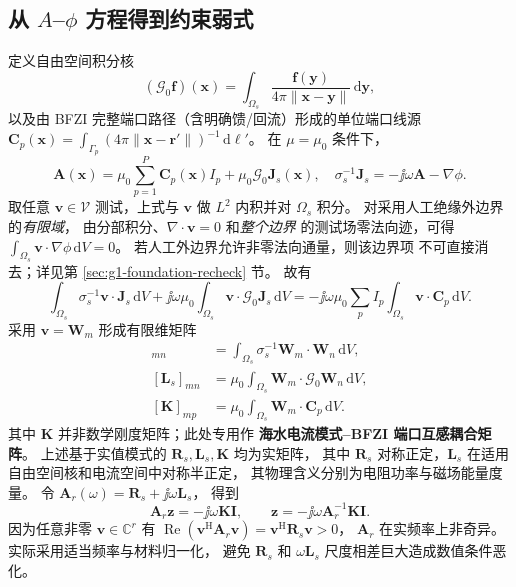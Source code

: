 \subsection{从 \(A\)--\(\phi\) 方程得到约束弱式}
定义自由空间积分核
\begin{equation}
(\mathcal G_0\bm f)(\bm x)
=\int_{\Omega_s}\frac{\bm f(\bm y)}
{4\pi\|\bm x-\bm y\|}\,\mathrm d\bm y,
\label{eq:free-g}
\end{equation}
以及由 BFZI 完整端口路径（含明确馈/回流）形成的单位端口线源
\(\bm C_p(\bm x)=\int_{\Gamma_p}(4\pi\|\bm x-\bm r'\|)^{-1}
\,\mathrm d\bm\ell'\)。
在 \(\mu=\mu_0\) 条件下，
\[
\bm A(\bm x)
=\mu_0\sum_{p=1}^P \bm C_p(\bm x)I_p
+\mu_0\mathcal G_0\bm J_s(\bm x),\quad
\sigma_s^{-1}\bm J_s=-\jj\omega\bm A-\nabla\phi .
\]
取任意 \(\bm v\in\mathcal V\) 测试，上式与 \(\bm v\) 做
\(L^2\) 内积并对 \(\Omega_s\) 积分。
对采用人工绝缘外边界的\emph{有限域}，
由分部积分、\(\nabla\cdot\bm v=0\) 和\emph{整个边界}
的测试场零法向迹，可得
\(\int_{\Omega_s}\bm v\cdot\nabla\phi\,\mathrm dV=0\)。
若人工外边界允许非零法向通量，则该边界项
不可直接消去；详见第 \ref{sec:g1-foundation-recheck} 节。
故有
\begin{equation}
\int_{\Omega_s}\sigma_s^{-1}\bm v\cdot\bm J_s\,\mathrm dV
+\jj\omega\mu_0\int_{\Omega_s}\bm v\cdot\mathcal G_0\bm J_s\,\mathrm dV
=-\jj\omega\mu_0\sum_p I_p\int_{\Omega_s}\bm v\cdot\bm C_p\,\mathrm dV .
\label{eq:sea-weak}
\end{equation}
采用 \(\bm v=\bm W_m\) 形成有限维矩阵
\begin{align}
[\bm R_s]_{mn}
&=\int_{\Omega_s}\sigma_s^{-1}\bm W_m\cdot\bm W_n\,\mathrm dV,
\label{eq:Rs}\\
[\bm L_s]_{mn}
&=\mu_0\int_{\Omega_s}\bm W_m\cdot\mathcal G_0\bm W_n\,\mathrm dV,
\label{eq:Ls}\\
[\bm K]_{mp}
&=\mu_0\int_{\Omega_s}\bm W_m\cdot\bm C_p\,\mathrm dV .
\label{eq:Kbfzi}
\end{align}
其中 \(\bm K\) 并非数学刚度矩阵；此处专用作
\textbf{海水电流模式--BFZI 端口互感耦合矩阵}。
上述基于实值模式的 \(\bm R_s,\bm L_s,\bm K\) 均为实矩阵，
其中 \(\bm R_s\) 对称正定，\(\bm L_s\) 在适用自由空间核和电流空间中对称半正定，
其物理含义分别为电阻功率与磁场能量度量。
令
\(\bm A_r(\omega)=\bm R_s+\jj\omega\bm L_s\)，
得到
\begin{equation}
\boxed{\bm A_r\bm z=-\jj\omega\bm K\bm I,\qquad
\bm z=-\jj\omega\bm A_r^{-1}\bm K\bm I.}
\label{eq:sea-current-state}
\end{equation}
因为任意非零 \(\bm v\in\mathbb C^r\) 有
\(\operatorname{Re}(\bm v^{\mathrm H}\bm A_r\bm v)
=\bm v^{\mathrm H}\bm R_s\bm v>0\)，
\(\bm A_r\) 在实频率上非奇异。实际采用适当频率与材料归一化，
避免 \(\bm R_s\) 和 \(\omega\bm L_s\) 尺度相差巨大造成数值条件恶化。

